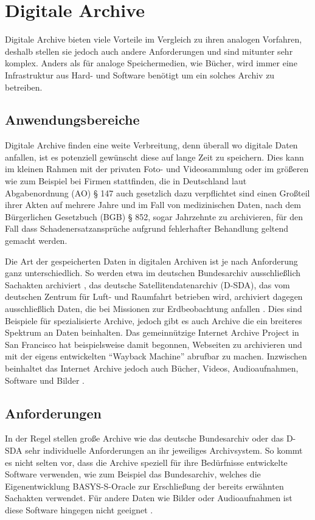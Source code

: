 \documentclass[conference,compsoc,final,a4paper]{IEEEtran}
\begin{document}
\section{Digitale Archive}
Digitale Archive bieten viele Vorteile im Vergleich zu ihren analogen Vorfahren, deshalb stellen sie jedoch auch andere Anforderungen und sind mitunter sehr komplex. Anders als für analoge Speichermedien, wie Bücher, wird immer eine Infrastruktur aus Hard- und Software benötigt um ein solches Archiv zu betreiben.

\subsection{Anwendungsbereiche}
Digitale Archive finden eine weite Verbreitung, denn überall wo digitale Daten anfallen, ist es potenziell gewünscht diese auf lange Zeit zu speichern. Dies kann im kleinen Rahmen mit der privaten Foto- und Videosammlung oder im größeren wie zum Beispiel bei Firmen stattfinden, die in Deutschland laut Abgabenordnung (AO) § 147 auch gesetzlich dazu verpflichtet sind einen Großteil ihrer Akten auf mehrere Jahre und im Fall von medizinischen Daten, nach dem Bürgerlichen Gesetzbuch (BGB) § 852, sogar Jahrzehnte zu archivieren, für den Fall dass Schadenersatzansprüche aufgrund fehlerhafter Behandlung geltend gemacht werden.

Die Art der gespeicherten Daten in digitalen Archiven ist je nach Anforderung ganz unterschiedlich. So werden etwa im deutschen Bundesarchiv ausschließlich Sachakten archiviert \autocite{Berger2005}, das deutsche Satellitendatenarchiv (\acs{D-SDA}), das vom deutschen Zentrum für Luft- und Raumfahrt betrieben wird, archiviert dagegen ausschließlich Daten, die bei Missionen zur Erdbeobachtung anfallen \autocite{Memishi2019}. Dies sind Beispiele für spezialisierte Archive, jedoch gibt es auch Archive die ein breiteres Spektrum an Daten beinhalten. Das gemeinnützige Internet Archive Project in San Francisco hat beispielsweise damit begonnen, Webseiten zu archivieren und mit der eigens entwickelten ``Wayback Machine'' abrufbar zu machen. Inzwischen beinhaltet das Internet Archive jedoch auch Bücher, Videos, Audioaufnahmen, Software und Bilder \autocite{AboutIA}.

\subsection{Anforderungen}
In der Regel stellen große Archive wie das deutsche Bundesarchiv oder das \acs{D-SDA} sehr individuelle Anforderungen an ihr jeweiliges Archivsystem. So kommt es nicht selten vor, dass die Archive speziell für ihre Bedürfnisse entwickelte Software verwenden, wie zum Beispiel das Bundesarchiv, welches die Eigenentwicklung BASYS-S-Oracle zur Erschließung der bereits erwähnten Sachakten verwendet. Für andere Daten wie Bilder oder Audioaufnahmen ist diese Software hingegen nicht geeignet \autocite{Berger2005}.
\end{document}
